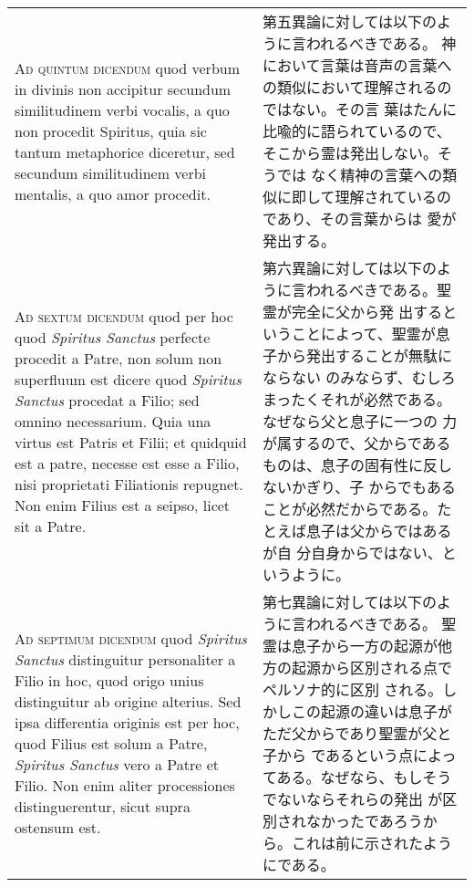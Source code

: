 \documentclass[10pt]{jsarticle} %
\begin{document}
\begin{longtable}{p{21em}p{21em}}
\\



{\scshape Ad quintum dicendum} quod verbum in divinis non accipitur secundum
similitudinem verbi vocalis, a quo non procedit  Spiritus, quia sic
tantum metaphorice diceretur, sed secundum similitudinem verbi
mentalis, a quo amor procedit.

&

第五異論に対しては以下のように言われるべきである。
神において言葉は音声の言葉への類似において理解されるのではない。その言
 葉はたんに比喩的に語られているので、そこから霊は発出しない。そうでは
 なく精神の言葉への類似に即して理解されているのであり、その言葉からは
 愛が発出する。

\\



{\scshape Ad sextum dicendum} quod per hoc quod {\itshape  Spiritus Sanctus}
perfecte procedit a Patre, non solum non superfluum est dicere quod
{\itshape  Spiritus Sanctus} procedat a Filio; sed omnino
necessarium. Quia una virtus est Patris et Filii; et quidquid est a
patre, necesse est esse a Filio, nisi proprietati Filiationis
repugnet. Non enim Filius est a seipso, licet sit a Patre.

&

第六異論に対しては以下のように言われるべきである。聖霊が完全に父から発
 出するということによって、聖霊が息子から発出することが無駄にならない
 のみならず、むしろまったくそれが必然である。なぜなら父と息子に一つの
 力が属するので、父からであるものは、息子の固有性に反しないかぎり、子
 からでもあることが必然だからである。たとえば息子は父からではあるが自
 分自身からではない、というように。

\\



{\scshape Ad septimum dicendum} quod {\itshape  Spiritus Sanctus} distinguitur
personaliter a Filio in hoc, quod origo unius distinguitur ab origine
alterius. Sed ipsa differentia originis est per hoc, quod Filius est
solum a Patre, {\itshape  Spiritus Sanctus} vero a Patre et Filio. Non
enim aliter processiones distinguerentur, sicut supra ostensum est.

&

第七異論に対しては以下のように言われるべきである。
聖霊は息子から一方の起源が他方の起源から区別される点でペルソナ的に区別
 される。しかしこの起源の違いは息子がただ父からであり聖霊が父と子から
 であるという点によってある。なぜなら、もしそうでないならそれらの発出
 が区別されなかったであろうから。これは前に示されたようにである。



\end{longtable}
\newpage
\end{document}
